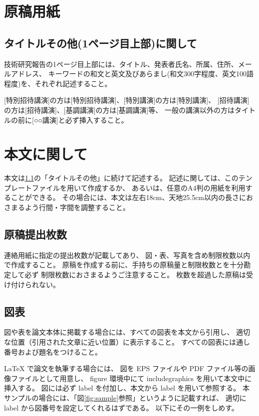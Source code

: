 \documentclass[a4paper,twocolumn]{jsarticle}
\begin{document}
\maketitle

\section{原稿用紙}
\subsection{タイトルその他(1ページ目上部)に関して}
\label{subsec:intro}
技術研究報告の1ページ目上部には、タイトル、発表者氏名、所属、住所、メールアドレス、
キーワードの和文と英文及びあらまし(和文300字程度、英文100語程度)を、それぞれ記述すること。

[特別招待講演]の方は[特別招待講演]、[特別講演]の方は[特別講演]、
[招待講演]の方は[招待講演]、[基調講演]の方は[基調講演]等、
一般の講演以外の方はタイトルの前に[○○講演]と必ず挿入すること。

\section{本文に関して}
本文は\ref{subsec:intro}の「タイトルその他」に続けて記述する。
記述に関しては、このテンプレートファイルを用いて作成するか、
あるいは、任意のA4判の用紙を利用することができる。
その場合には、本文は左右18cm、天地25.5cm以内の長さにおさまるよう行間・字間を調整すること。

\subsection{原稿提出枚数}
連絡用紙に指定の提出枚数が記載してあり、
図・表、写真を含め制限枚数以内で作成すること。
原稿を作成する前に、手持ちの原稿量と制限枚数とを十分勘定して必ず
制限枚数におさまるようご注意すること。
枚数を超過した原稿は受け付けられない。

\subsection{図表}

図や表を論文本体に掲載する場合には、すべての図表を本文から引用し、
適切な位置（引用された文章に近い位置）に表示すること。
すべての図表には通し番号および題名をつけること。

LaTeX で論文を執筆する場合には、
図を EPS ファイルや PDF ファイル等の画像ファイルとして用意し、
figure 環境中にて includegraphics を用いて本文中に挿入する。
図には必ず label を付加し、本文から label を用いて参照する。
本サンプルの場合には、「図\ref{fig:sample}参照」というように記載すれば、
適切に label から図番号を設定してくれるはずである。
以下にその一例をしめす。
\end{document}
